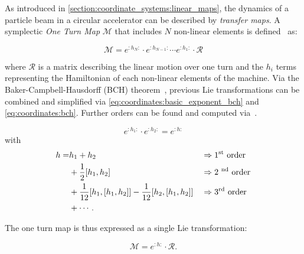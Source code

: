 \subsubsection{}

As introduced in \cref{section:coordinate_systems:linear_maps}, the dynamics of a particle beam in a
circular accelerator can be described by \textit{transfer maps}. A symplectic \textit{One Turn Map}
$\mathcal{M}$ that includes $N$ non-linear elements is defined~\cite{dragt_overview_2013} as:

\begin{equation}
    \mathcal{M} = e^{:h_N:} \cdot e^{:h_{N-1}:} \cdots e^{:h_1:} \cdot \mathcal{R}
\end{equation}

where $\mathcal{R}$ is a matrix describing the linear motion over one turn and the $h_i$ terms
representing the Hamiltonian of each non-linear elements of the machine.
Via the Baker-Campbell-Hausdorff (BCH) theorem~\cite{forest_beam_1998,casas_efficient_2009},
previous Lie transformations can be combined and simplified via
\cref{eq:coordinates:basic_exponent_bch} and \cref{eq:coordinates:bch}. Further orders can be found
and computed via~\cite{casas_efficient_2009}.

\begin{equation}
    e^{:h_1:} \cdot e^{:h_2:} = e^{:h:}
    \label{eq:coordinates:basic_exponent_bch}
\end{equation}
with 
\begin{equation}
    \begin{alignedat}{3}
      h =& h_1 + h_2  && \Rightarrow \text{1\textsuperscript{st} order}\\
             & + \frac{1}{2} [h_1, h_2]  && \Rightarrow \text{2 \textsuperscript{nd} order}\\
             & + \frac{1}{12} [h_1, [h_1, h_2]] - \frac{1}{12} [h_2, [h_1, h_2]] \quad && \Rightarrow \text{3\textsuperscript{rd} order}\\
             & + \cdots.
    \end{alignedat}
    \label{eq:coordinates:bch}
\end{equation}


The one turn map is thus expressed as a single Lie transformation:

\begin{equation}
    \mathcal{M} = e^{:h:} \cdot \mathcal{R}.
   \label{eq:coordinate_systems:non_linear_map}
\end{equation}

